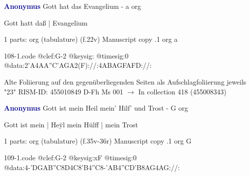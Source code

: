 \documentclass[twocolumn]{book}
\begin{document}
\newline \par \vspace{7pt} \textcolor{darkblue}{\textbf{Anonymus  }}
\newline Gott hat das Evangelium - a
\newline org
\newline \begin{itshape}[f.22v, at left:] Gott hatt daß | Evangelium\end{itshape} 
\newline \textcolor{darkblue}{}  1 parts: org (tabulature)  (f.22v)
\newline Manuscript copy
.1  org  a  
\begin{filecontents*}{108-1.code}
@clef:G-2
@keysig:
@timesig:0
@data:2'A4AA''C'AGA2(F)://:4ABAGFAFD://:
\end{filecontents*}
\newline
%

\newline Alte Foliierung auf den gegenüberliegenden Seiten als Aufschlagfoliierung jeweils "23"
\newline RISM-ID: 455010849
\newline D-Fh  Ms 001
\newline $\rightarrow$ In collection 418 (455008343)
      
\newline \par \vspace{7pt} \textcolor{darkblue}{\textbf{Anonymus  }}
\newline Gott ist mein Heil mein' Hilf' und Trost - G
\newline org
\newline \begin{itshape}[f.35v, at left:] Gott ist mein | Heÿl mein Hülff | mein Trost\end{itshape} 
\newline \textcolor{darkblue}{}  1 parts: org (tabulature)  (f.35v-36r)
\newline Manuscript copy
.1  org  G  
\begin{filecontents*}{109-1.code}
@clef:G-2
@keysig:xF
@timesig:0
@data:4-'DGAB''C8D4C8'B4''C8-'AB4''CD'B{8AG}4AG://:
\end{filecontents*}
\newline
%
\end{document}
